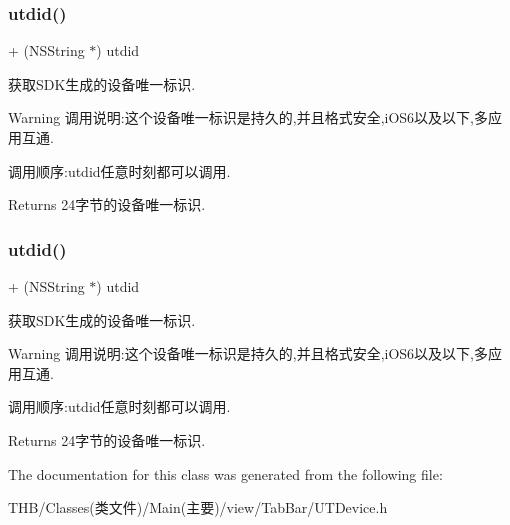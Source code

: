 \subsubsection{\texorpdfstring{utdid()}{utdid()}\hspace{0.1cm}{\footnotesize\ttfamily [1/2]}}
{\footnotesize\ttfamily + (N\+S\+String $\ast$) utdid \begin{DoxyParamCaption}{ }\end{DoxyParamCaption}}



获取\+S\+D\+K生成的设备唯一标识. 

\begin{DoxyWarning}{Warning}
调用说明\+:这个设备唯一标识是持久的,并且格式安全,i\+O\+S6以及以下,多应用互通. \begin{DoxyVerb}                         调用顺序:utdid任意时刻都可以调用.
\end{DoxyVerb}

\end{DoxyWarning}
\begin{DoxyReturn}{Returns}
24字节的设备唯一标识. 
\end{DoxyReturn}
\mbox{\label{interface_u_t_device_a679ac9f6e75a769943db507089abb879}} 
\subsubsection{\texorpdfstring{utdid()}{utdid()}\hspace{0.1cm}{\footnotesize\ttfamily [2/2]}}
{\footnotesize\ttfamily + (N\+S\+String $\ast$) utdid \begin{DoxyParamCaption}{ }\end{DoxyParamCaption}}



获取\+S\+D\+K生成的设备唯一标识. 

\begin{DoxyWarning}{Warning}
调用说明\+:这个设备唯一标识是持久的,并且格式安全,i\+O\+S6以及以下,多应用互通. \begin{DoxyVerb}                         调用顺序:utdid任意时刻都可以调用.
\end{DoxyVerb}

\end{DoxyWarning}
\begin{DoxyReturn}{Returns}
24字节的设备唯一标识. 
\end{DoxyReturn}


The documentation for this class was generated from the following file\+:\begin{DoxyCompactItemize}
\item 
T\+H\+B/\+Classes(类文件)/\+Main(主要)/view/\+Tab\+Bar/U\+T\+Device.\+h\end{DoxyCompactItemize}
